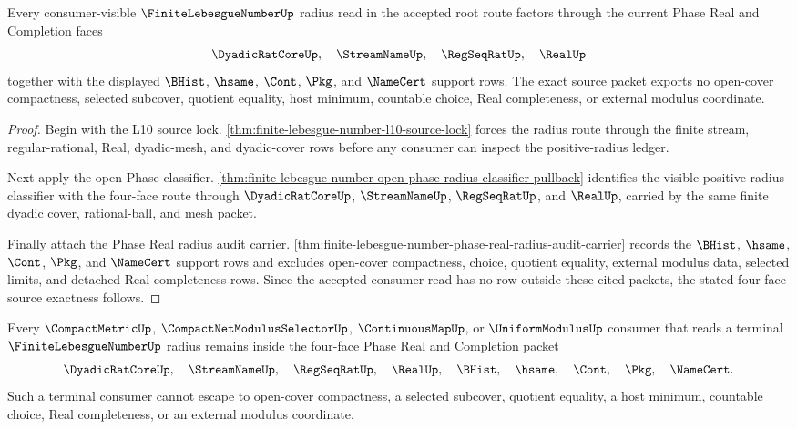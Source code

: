 \begin{theorem}
\label{thm:finite-lebesgue-number-phase-real-four-face-source-exactness}
Every consumer-visible $\FiniteLebesgueNumberUp$ radius read in the accepted root route factors through the current Phase Real and Completion faces
$$
\DyadicRatCoreUp,\quad \StreamNameUp,\quad \RegSeqRatUp,\quad \RealUp
$$
together with the displayed $\BHist$, $\hsame$, $\Cont$, $\Pkg$, and $\NameCert$ support rows. The exact source packet exports no open-cover compactness, selected subcover, quotient equality, host minimum, countable choice, Real completeness, or external modulus coordinate.
\end{theorem}

\begin{proof}
Begin with the L10 source lock. \autoref{thm:finite-lebesgue-number-l10-source-lock} forces the radius route through the finite stream, regular-rational, Real, dyadic-mesh, and dyadic-cover rows before any consumer can inspect the positive-radius ledger.

Next apply the open Phase classifier. \autoref{thm:finite-lebesgue-number-open-phase-radius-classifier-pullback} identifies the visible positive-radius classifier with the four-face route through $\DyadicRatCoreUp$, $\StreamNameUp$, $\RegSeqRatUp$, and $\RealUp$, carried by the same finite dyadic cover, rational-ball, and mesh packet.

Finally attach the Phase Real radius audit carrier. \autoref{thm:finite-lebesgue-number-phase-real-radius-audit-carrier} records the $\BHist$, $\hsame$, $\Cont$, $\Pkg$, and $\NameCert$ support rows and excludes open-cover compactness, choice, quotient equality, external modulus data, selected limits, and detached Real-completeness rows. Since the accepted consumer read has no row outside these cited packets, the stated four-face source exactness follows.
\end{proof}

\begin{theorem}
\label{thm:finite-lebesgue-number-terminal-radius-phase-consumer-nonescape}
Every $\CompactMetricUp$, $\CompactNetModulusSelectorUp$, $\ContinuousMapUp$, or $\UniformModulusUp$ consumer that reads a terminal $\FiniteLebesgueNumberUp$ radius remains inside the four-face Phase Real and Completion packet
$$
\DyadicRatCoreUp,\quad \StreamNameUp,\quad \RegSeqRatUp,\quad \RealUp,\quad \BHist,\quad \hsame,\quad \Cont,\quad \Pkg,\quad \NameCert .
$$
Such a terminal consumer cannot escape to open-cover compactness, a selected subcover, quotient equality, a host minimum, countable choice, Real completeness, or an external modulus coordinate.
\end{theorem}

